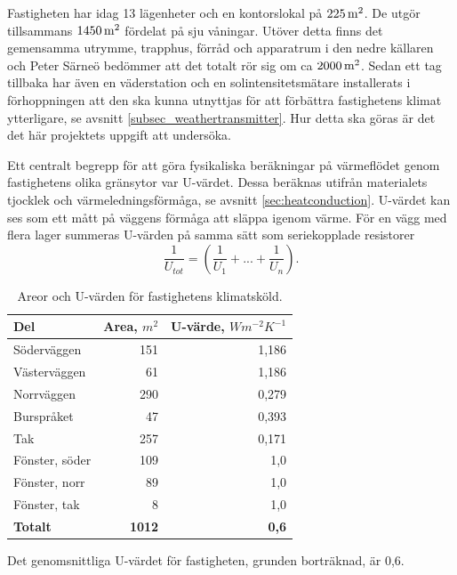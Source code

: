 Fastigheten har idag 13 lägenheter och en kontorslokal på $\unit[225]{m^2}$. De utgör tillsammans $\unit[1450]{m^2}$ fördelat på sju våningar. Utöver detta finns det gemensamma utrymme, trapphus, förråd och apparatrum i den nedre källaren och Peter Särneö\cite{petersarneo} bedömmer att det totalt rör sig om ca $\unit[2000]{m^2}$. Sedan ett tag tillbaka har även en väderstation och en solintensitetsmätare installerats i förhoppningen att den ska kunna utnyttjas för att förbättra fastighetens klimat ytterligare, se avsnitt \ref{subsec_weathertransmitter}. Hur detta ska göras är det det här projektets uppgift att undersöka.

Ett centralt begrepp för att göra fysikaliska beräkningar på värmeflödet genom fastighetens olika gränsytor var U-värdet. Dessa beräknas utifrån materialets tjocklek och värmeledningsförmåga, se avsnitt \ref{sec:heatconduction}. U-värdet kan ses som ett mått på väggens förmåga att släppa igenom värme. För en vägg med flera lager summeras U-värden på samma sätt som seriekopplade resistorer
\begin{equation}
\label{eq:uvalue}
\frac{1}{U_{tot}}= (\frac{1}{U_1}+...+\frac{1}{U_n}).
\end{equation}

\begin{table}[hbtp]
\centering
\caption{Areor och U-värden för fastighetens klimatsköld.}
\label{tbl:uvalue}

\begin{tabular}
{|l|r|r|}
\hline
\textbf{Del} & \textbf{Area, $\unit{m^2}$} & \parbox[c][1.2cm][c]{2 cm}{\textbf{U-värde,\\$\unit{Wm^{-2}K^{-1}}$}} \\
\hline
Söderväggen &  151 & 1,186 \\ 
Västerväggen & 61 & 1,186 \\
Norrväggen & 290 & 0,279 \\
Burspråket & 47 & 0,393 \\
Tak & 257 & 0,171 \\
\hline
Fönster, söder & 109 & 1,0 \\
Fönster, norr & 89 & 1,0 \\
Fönster, tak & 8 & 1,0 \\
\hline
\textbf{Totalt} & \textbf{1012} & \textbf{0,6}\\
\hline
\end{tabular}
\end{table}

Det genomsnittliga U-värdet för fastigheten, grunden borträknad, är 0,6.

